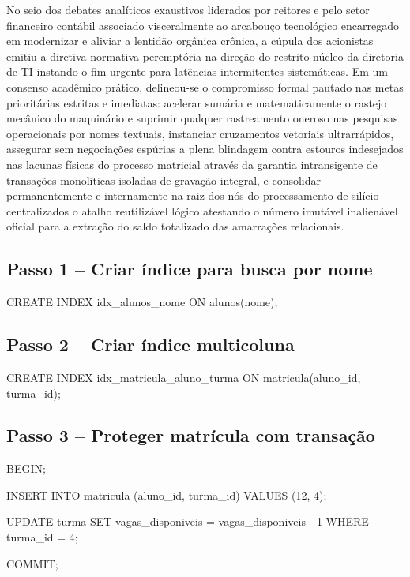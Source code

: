 No seio dos debates analíticos exaustivos liderados por reitores e pelo setor financeiro contábil associado visceralmente ao arcabouço tecnológico encarregado em modernizar e aliviar a lentidão orgânica crônica, a cúpula dos acionistas emitiu a diretiva normativa peremptória na direção do restrito núcleo da diretoria de TI instando o fim urgente para latências intermitentes sistemáticas. Em um consenso acadêmico prático, delineou-se o compromisso formal pautado nas metas prioritárias estritas e imediatas: acelerar sumária e matematicamente o rastejo mecânico do maquinário e suprimir qualquer rastreamento oneroso nas pesquisas operacionais por nomes textuais, instanciar cruzamentos vetoriais ultrarrápidos, assegurar sem negociações espúrias a plena blindagem contra estouros indesejados nas lacunas físicas do processo matricial através da garantia intransigente de transações monolíticas isoladas de gravação integral, e consolidar permanentemente e internamente na raiz dos nós do processamento de silício centralizados o atalho reutilizável lógico atestando o número imutável inalienável oficial para a extração do saldo totalizado das amarrações relacionais.

\subsection*{Passo 1 -- Criar índice para busca por nome}

\begin{sqlcode}
CREATE INDEX idx_alunos_nome
ON alunos(nome);
\end{sqlcode}

\subsection*{Passo 2 -- Criar índice multicoluna}

\begin{sqlcode}
CREATE INDEX idx_matricula_aluno_turma
ON matricula(aluno_id, turma_id);
\end{sqlcode}

\subsection*{Passo 3 -- Proteger matrícula com transação}

\begin{sqlcode}
BEGIN;

INSERT INTO matricula (aluno_id, turma_id)
VALUES (12, 4);

UPDATE turma
SET vagas_disponiveis = vagas_disponiveis - 1
WHERE turma_id = 4;

COMMIT;
\end{sqlcode}

